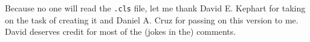 \begin{dedication}
\end{dedication}

\begin{acknowledgments}
Because no one will read the \verb|.cls| file, let me thank David E. Kephart for taking on the task of creating it and Daniel A. Cruz for passing on this version to me. David deserves credit for most of the (jokes in the) comments. 
\end{acknowledgments}